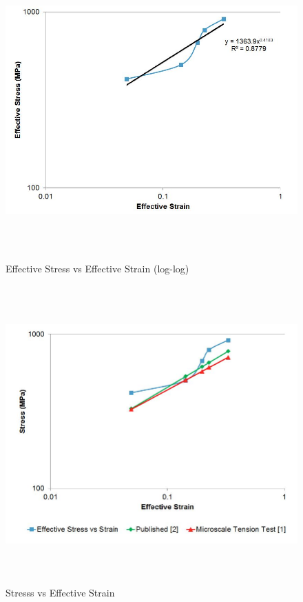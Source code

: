 \documentclass[12pt]{article}
\begin{document}
\begin{figure}[h] %
   \centering
   \includegraphics[width=6in,height=4.5in]{eff_stress_vs_strain.jpg} 
   \caption{Effective Stress vs Effective Strain (log-log)}
\end{figure}

\newpage

\begin{figure}[h!]
  \centering
    \includegraphics[width=6in,height=4.5in]{stress_vs_strain.jpg}
    \caption{Stresss vs Effective Strain}
\end{figure}
\end{document}
